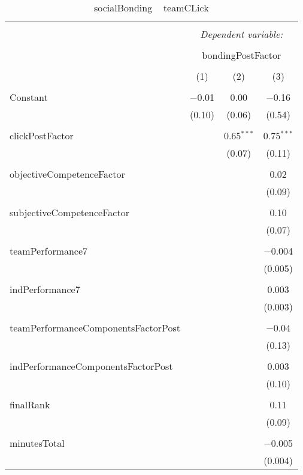 \documentclass[12pt]{report}
\begin{document}
\begin{table}[!htbp] \centering
  \caption{socialBonding ~ teamCLick}
  \label{}
\begin{tabular}{@{\extracolsep{5pt}}lccc}
\\[-1.8ex]\hline
\hline \\[-1.8ex]
 & \multicolumn{3}{c}{\textit{Dependent variable:}} \\
\cline{2-4}
\\[-1.8ex] & \multicolumn{3}{c}{bondingPostFactor} \\
\\[-1.8ex] & (1) & (2) & (3)\\
\hline \\[-1.8ex]
 Constant & $-$0.01 & 0.00 & $-$0.16 \\
  & (0.10) & (0.06) & (0.54) \\
  & & & \\
 clickPostFactor &  & 0.65$^{***}$ & 0.75$^{***}$ \\
  &  & (0.07) & (0.11) \\
  & & & \\
 objectiveCompetenceFactor &  &  & 0.02 \\
  &  &  & (0.09) \\
  & & & \\
 subjectiveCompetenceFactor &  &  & 0.10 \\
  &  &  & (0.07) \\
  & & & \\
 teamPerformance7 &  &  & $-$0.004 \\
  &  &  & (0.005) \\
  & & & \\
 indPerformance7 &  &  & 0.003 \\
  &  &  & (0.003) \\
  & & & \\
 teamPerformanceComponentsFactorPost &  &  & $-$0.04 \\
  &  &  & (0.13) \\
  & & & \\
 indPerformanceComponentsFactorPost &  &  & 0.003 \\
  &  &  & (0.10) \\
  & & & \\
 finalRank &  &  & 0.11 \\
  &  &  & (0.09) \\
  & & & \\
 minutesTotal &  &  & $-$0.005 \\
  &  &  & (0.004) \\

\end{tabular}
\end{table}
\end{document}
